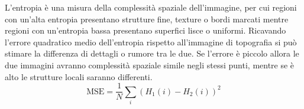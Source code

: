 \documentclass[../main.tex]{subfiles}
\begin{document}
L'entropia è una misura della complessità spaziale dell'immagine, per cui regioni con un'alta entropia presentano strutture fine, texture o bordi marcati mentre regioni con un'entropia bassa presentano superfici lisce o uniformi. Ricavando l'errore quadratico medio dell'entropia rispetto all'immagine di topografia si può stimare la differenza di dettagli o rumore tra le due. Se l'errore è piccolo allora le due immagini avranno complessità spaziale simile negli stessi punti, mentre se è alto le strutture locali saranno differenti.
\begin{equation}
	\text{MSE} = \frac{1}{N}\sum_i\left(H_1(i)-H_2(i)\right)^2
\end{equation}
\end{document}
